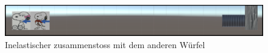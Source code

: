 \documentclass[../main.tex]{subfiles}
\begin{document}
\begin{enumerate}
     \begin{figure}[h]
                \begin{center}
                    \centerline{\includegraphics[width=155mm]{./images/2Lab_2dPictureNr3.png}}
                    \caption{Inelastischer zusammenstoss mit dem anderen Würfel}
                    \label{fig:2Lab_2dPictureNr3}
                \end{center}
     \end{figure}
 \end{enumerate}
\end{document}
